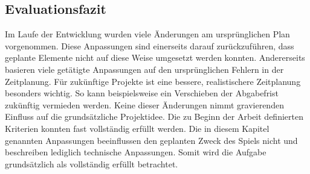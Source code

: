 \subsection{Evaluationsfazit}
Im Laufe der Entwicklung wurden viele Änderungen am ursprünglichen Plan vorgenommen. Diese Anpassungen sind einerseits darauf zurückzuführen, dass geplante Elemente nicht auf diese Weise umgesetzt werden konnten. Andererseits basieren viele getätigte Anpassungen auf den ursprünglichen Fehlern in der Zeitplanung. Für zukünftige Projekte ist eine bessere, realistischere Zeitplanung besonders wichtig. So kann beispielsweise ein Verschieben der Abgabefrist zukünftig vermieden werden.
Keine dieser Änderungen nimmt gravierenden Einfluss auf die grundsätzliche Projektidee. Die zu Beginn der Arbeit definierten Kriterien konnten fast vollständig erfüllt werden. Die in diesem Kapitel genannten Anpassungen beeinflussen den geplanten Zweck des Spiels nicht und beschreiben lediglich technische Anpassungen. Somit wird die Aufgabe grundsätzlich als vollständig erfüllt betrachtet.
 

